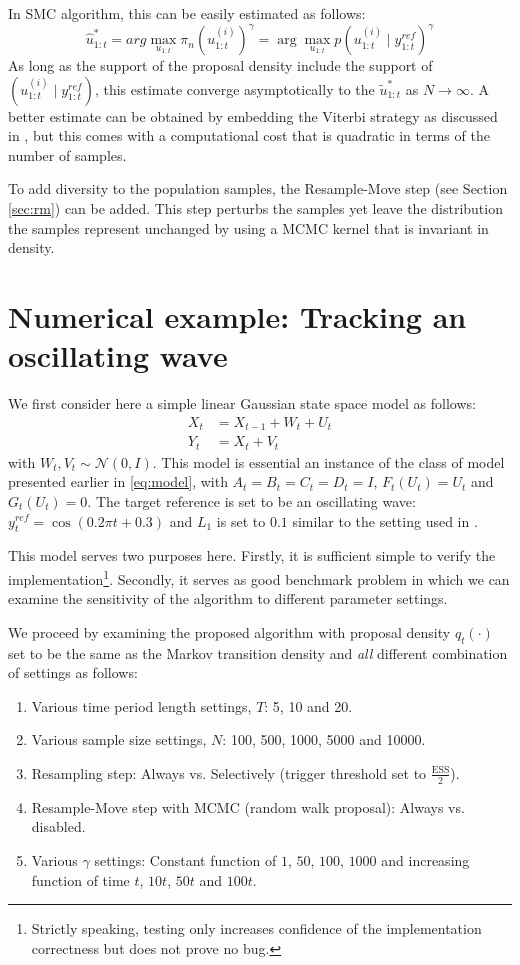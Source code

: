 In SMC algorithm, this can be easily estimated as follows:
\begin{equation}
\hat{u}^*_{1:t} = arg\max_{u_{1:t}} \pi_n(u^{(i)}_{1:t})^\gamma = \arg\max_{u_{1:t}} p(u^{(i)}_{1:t} \mid y^{ref}_{1:t})^\gamma
\end{equation}
As long as the support of the proposal density include the support of $(u^{(i)}_{1:t} \mid y^{ref}_{1:t})$, this estimate converge asymptotically to the $\tilde{u}^*_{1:t}$ as $N \to \infty$. A better estimate can be obtained by embedding the Viterbi strategy as discussed in \cite{SG01}, but this comes with a computational cost that is quadratic in terms of the number of samples.

To add diversity to the population samples, the Resample-Move step (see Section \ref{sec:rm}) can be added. This step perturbs the samples yet leave the distribution the samples represent unchanged by using a MCMC kernel that is invariant in density.

\section{Numerical example: Tracking an oscillating wave}
\label{sec:exp1}
We first consider here a simple linear Gaussian state space model as follows:
\begin{align}
  X_t &= X_{t-1} + W_t + U_t \nonumber \\
  Y_t &= X_t + V_t
\label{eq:refnmodel}
\end{align}
with $W_t, V_t \sim \mathcal{N}(0,I)$. This model is essential an instance of the class of model presented earlier in \eqref{eq:model}, with $A_t=B_t=C_t=D_t=I$, $F_t(U_t)=U_t$ and $G_t(U_t)=0$. The target reference is set to be an oscillating wave: $y^{ref}_t = \cos(0.2 \pi t + 0.3)$ and $L_1$ is set to $0.1$ similar to the setting used in \cite{NK11}.

This model serves two purposes here. Firstly, it is sufficient simple to verify the implementation\footnote{Strictly speaking, testing only increases confidence of the implementation correctness but does not prove no bug.}. Secondly, it serves as good benchmark problem in which we can examine the sensitivity of the algorithm to different parameter settings.

We proceed by examining the proposed algorithm with proposal density $q_t(\cdot)$ set to be the same as the Markov transition density and \emph{all} different combination of settings as follows:
\begin{enumerate}
\item Various time period length settings, $T$: 5, 10 and 20.
\item Various sample size settings, $N$: 100, 500, 1000, 5000 and 10000.
\item Resampling step: Always vs. Selectively (trigger threshold set to $\frac{\text{ESS}}{2}$).
\item Resample-Move step with MCMC (random walk proposal): Always vs. disabled.
\item Various $\gamma$ settings: Constant function of $1$, $50$, $100$, $1000$ and increasing function of time $t$, $10t$, $50t$ and $100t$.
\end{enumerate}

